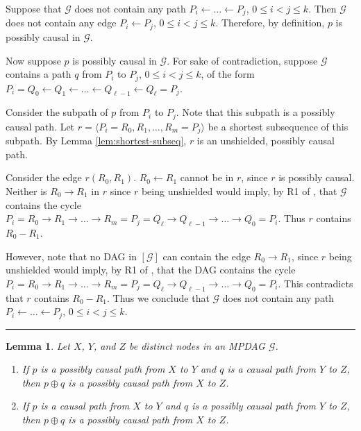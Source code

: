 \documentclass[twoside]{article}
\newtheorem{lemma}[theorem]{Lemma}
\newcommand{\g}[1][G]{\mathcal{#1}}
\newenvironment{proofof}[1][]{\begin{trivlist}
\item[\hskip \labelsep {\bfseries Proof of #1.}]}{\hfill\BlackBox\end{trivlist}}
\newcommand{\BlackBox}{\rule{1.5ex}{1.5ex}}
\begin{document}
\begin{proofof}[Lemma \ref{lem:nobackpaths}]
    Suppose that $\g$ does not contain any path $P_i \gets \dots \gets P_j$, $0 \le i < j \le k$. Then $\g$ does not contain any edge $P_i \gets P_j$, $0 \le i < j \le k$. Therefore, by definition, $p$ is possibly causal in $\g$.

    Now suppose $p$ is possibly causal in $\g$. For sake of contradiction, suppose $\g$ contains a path $q$ from $P_i$ to $P_j$, $0 \le i < j \le k$, of the form $P_i=Q_0 \gets Q_1 \gets \dots \gets Q_{\ell-1} \gets Q_{\ell} =P_j$.

    Consider the subpath of $p$ from $P_i$ to $P_j$. Note that this subpath is a possibly causal path. Let $r=\langle P_i = R_0, R_1, \dots, R_m= P_j\rangle$ be a shortest subsequence of this subpath. By Lemma \ref{lem:shortest-subseq}, $r$ is an unshielded, possibly causal path.

    Consider the edge $r(R_0, R_1)$. $R_0 \gets R_1$ cannot be in $r$, since $r$ is possibly causal. Neither is $R_0 \to R_1$ in $r$ since $r$ being unshielded would imply, by R1 of \cite{meek1995causal}, that $\g$ contains the cycle $P_i= R_0 \to R_1 \to \dots \to R_m=P_j=Q_{\ell} \to Q_{\ell-1} \to \dots \to Q_0=P_i$. Thus $r$ contains $R_0 - R_1$. 

    However, note that no DAG in $[\g]$ can contain the edge $R_0 \to R_1$, since $r$ being unshielded would imply, by R1 of \cite{meek1995causal}, that the DAG contains the cycle $P_i= R_0 \to R_1 \to \dots \to R_m=P_j=Q_{\ell} \to Q_{\ell-1} \to \dots \to Q_0=P_i$. This contradicts that $r$ contains $R_0 - R_1$. Thus we conclude that $\g$ does not contain any path $P_i \gets \dots \gets P_j$, $0 \le i < j \le k$.
\end{proofof}


\begin{lemma}
\label{lem:concat}
    Let $X$, $Y$, and $Z$ be distinct nodes in an MPDAG $\g$.
    \begin{enumerate}[label=(\roman*)]
        \item \label{lem:concat-pc-p} 
        If $p$ is a possibly causal path from $X$ to $Y$ and $q$ is a causal path from $Y$ to $Z$, then $p \oplus q$ is a possibly causal path from $X$ to $Z$.
    
        \item \label{lem:concat-c-pc} 
        If $p$ is a causal path from $X$ to $Y$ and $q$ is a possibly causal path from $Y$ to $Z$, then $p \oplus q$ is a possibly causal path from $X$ to $Z$.
    \end{enumerate}
\end{lemma}
\end{document}
